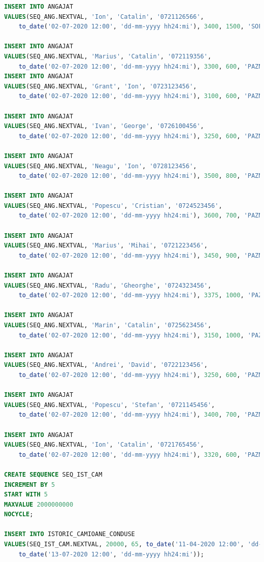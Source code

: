 \documentclass[12pt, a4paper]{article}
\begin{document}
\begin{lstlisting}[language=SQL]
INSERT INTO ANGAJAT
VALUES(SEQ_ANG.NEXTVAL, 'Ion', 'Catalin', '0721126566', 
    to_date('02-07-2020 12:00', 'dd-mm-yyyy hh24:mi'), 3400, 1500, 'SOFER', null);

INSERT INTO ANGAJAT
VALUES(SEQ_ANG.NEXTVAL, 'Marius', 'Catalin', '072119356', 
    to_date('02-07-2020 12:00', 'dd-mm-yyyy hh24:mi'), 3300, 600, 'PAZNIC', 1);
INSERT INTO ANGAJAT
VALUES(SEQ_ANG.NEXTVAL, 'Grant', 'Ion', '0723123456', 
    to_date('02-07-2020 12:00', 'dd-mm-yyyy hh24:mi'), 3100, 600, 'PAZNIC', 1);

INSERT INTO ANGAJAT
VALUES(SEQ_ANG.NEXTVAL, 'Ivan', 'George', '0726100456', 
    to_date('02-07-2020 12:00', 'dd-mm-yyyy hh24:mi'), 3250, 600, 'PAZNIC', 2);

INSERT INTO ANGAJAT
VALUES(SEQ_ANG.NEXTVAL, 'Neagu', 'Ion', '0728123456', 
    to_date('02-07-2020 12:00', 'dd-mm-yyyy hh24:mi'), 3500, 800, 'PAZNIC', 3);

INSERT INTO ANGAJAT
VALUES(SEQ_ANG.NEXTVAL, 'Popescu', 'Cristian', '0724523456', 
    to_date('02-07-2020 12:00', 'dd-mm-yyyy hh24:mi'), 3600, 700, 'PAZNIC', 4);

INSERT INTO ANGAJAT
VALUES(SEQ_ANG.NEXTVAL, 'Marius', 'Mihai', '0721223456', 
    to_date('02-07-2020 12:00', 'dd-mm-yyyy hh24:mi'), 3450, 900, 'PAZNIC', 5);

INSERT INTO ANGAJAT
VALUES(SEQ_ANG.NEXTVAL, 'Radu', 'Gheorghe', '0724323456', 
    to_date('02-07-2020 12:00', 'dd-mm-yyyy hh24:mi'), 3375, 1000, 'PAZNIC', 6);

INSERT INTO ANGAJAT
VALUES(SEQ_ANG.NEXTVAL, 'Marin', 'Catalin', '0725623456', 
    to_date('02-07-2020 12:00', 'dd-mm-yyyy hh24:mi'), 3150, 1000, 'PAZNIC', 7);

INSERT INTO ANGAJAT
VALUES(SEQ_ANG.NEXTVAL, 'Andrei', 'David', '0722123456', 
    to_date('02-07-2020 12:00', 'dd-mm-yyyy hh24:mi'), 3250, 600, 'PAZNIC', 8);

INSERT INTO ANGAJAT
VALUES(SEQ_ANG.NEXTVAL, 'Popescu', 'Stefan', '0721145456', 
    to_date('02-07-2020 12:00', 'dd-mm-yyyy hh24:mi'), 3400, 700, 'PAZNIC', 9);

INSERT INTO ANGAJAT
VALUES(SEQ_ANG.NEXTVAL, 'Ion', 'Catalin', '0721765456', 
    to_date('02-07-2020 12:00', 'dd-mm-yyyy hh24:mi'), 3320, 600, 'PAZNIC', 10);
         
CREATE SEQUENCE SEQ_IST_CAM
INCREMENT BY 5
START WITH 5
MAXVALUE 2000000000
NOCYCLE;

INSERT INTO ISTORIC_CAMIOANE_CONDUSE
VALUES(SEQ_IST_CAM.NEXTVAL, 20000, 65, to_date('11-04-2020 12:00', 'dd-mm-yyyy hh24:mi'), 
    to_date('13-07-2020 12:00', 'dd-mm-yyyy hh24:mi'));


\end{lstlisting}
\end{document}
